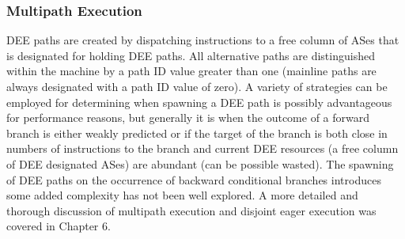 \documentclass{book}
\begin{document}
\subsubsection{Multipath Execution}
%
DEE paths are created by dispatching instructions to a 
free column of ASes that is designated for holding DEE paths.
All alternative paths are distinguished within the machine
by a path ID value greater than one (mainline paths are always
designated with a path ID value of zero).
A variety of strategies can be employed for determining when
spawning a DEE path is possibly advantageous for performance reasons,
but generally it is when the outcome of a forward branch is either
weakly predicted or if the target of the branch is both close
in numbers of instructions to the branch and current DEE resources (a
free column of DEE designated ASes) are abundant (can be possible
wasted).  
The spawning of DEE paths on the occurrence of backward conditional
branches introduces some added complexity
has not been well explored.
A more detailed and thorough discussion of multipath execution and
disjoint eager execution was covered in Chapter 6.
%
%
%
%
%
\end{document}
